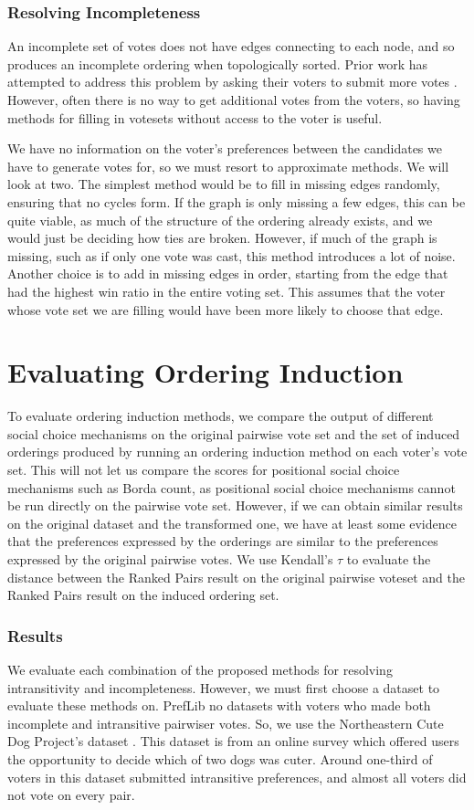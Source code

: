 \documentclass[letterpaper]{article} %
\begin{document}
\subsubsection{Resolving Incompleteness}
An incomplete set of votes does not have edges connecting to each node, and so produces an incomplete ordering when topologically sorted. Prior work has attempted to address this problem by asking their voters to submit more votes \cite{Conitzer2002}. However, often there is no way to get additional votes from the voters, so having methods for filling in votesets without access to the voter is useful. 

We have no information on the voter's preferences between the candidates we have to generate votes for, so we must resort to approximate methods. We will look at two. The simplest method would be to fill in missing edges randomly, ensuring that no cycles form. If the graph is only missing a few edges, this can be quite viable, as much of the structure of the ordering already exists, and we would just be deciding how ties are broken. However, if much of the graph is missing, such as if only one vote was cast, this method introduces a lot of noise. Another choice is to add in missing edges in order, starting from the edge that had the highest win ratio in the entire voting set. This assumes that the voter whose vote set we are filling would have been more likely to choose that edge.  

\section{Evaluating Ordering Induction}
To evaluate ordering induction methods, we compare the output of different social choice mechanisms on the original pairwise vote set and the set of induced orderings produced by running an ordering induction method on each voter's vote set. This will not let us compare the scores for positional social choice mechanisms such as Borda count, as positional social choice mechanisms cannot be run directly on the pairwise vote set. However, if we can obtain similar results on the original dataset and the transformed one, we have at least some evidence that the preferences expressed by the orderings are similar to the preferences expressed by the original pairwise votes. We use Kendall's $\tau$ \cite{Kendall1938} to evaluate the distance between the Ranked Pairs result on the original pairwise voteset and the Ranked Pairs result on the induced ordering set.

\subsubsection{Results}
We evaluate each combination of the proposed methods for resolving intransitivity and incompleteness. However, we must first choose a dataset to evaluate these methods on. PrefLib  no datasets with voters who made both incomplete and intransitive pairwiser votes. So, we use the Northeastern Cute Dog Project's dataset \cite{DogProject}. This dataset is from an online survey which offered users the opportunity to decide which of two dogs was cuter. Around one-third of voters in this dataset submitted intransitive preferences, and almost all voters did not vote on every pair. 
\end{document}
